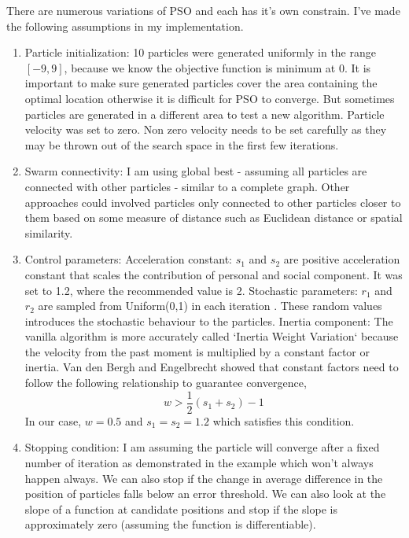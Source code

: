 \documentclass{article}
\begin{document}
There are numerous variations of PSO and each has it's own constrain. I've made the following assumptions in my implementation.
\begin{enumerate}
  \item Particle initialization: 10 particles were generated uniformly in the range $[-9, 9]$, because we know the objective function is minimum at 0. It is important to make sure generated particles cover the area containing the optimal location otherwise it is difficult for PSO to converge. But sometimes particles are generated in a different area to test a new algorithm. Particle velocity was set to zero. Non zero velocity needs to be set carefully as they may be thrown out of the search space in the first few iterations.
  \item Swarm connectivity: I am using global best - assuming all particles are connected with other particles - similar to a complete graph. Other approaches could involved particles only connected to other particles closer to them based on some measure of distance such as Euclidean distance or spatial similarity.
  \item Control parameters: 
  \subitem Acceleration constant: $s_1$ and $s_2$ are positive acceleration constant that scales the contribution of personal and social component. It was  set to 1.2, where the recommended value is 2. \cite{yang2010engineering}
  \subitem Stochastic parameters: $r_1$ and $r_2$ are sampled from Uniform(0,1) in each iteration \cite{engelbrecht2007computational}. These random values introduces the stochastic behaviour to the particles.
  \subitem Inertia component: The vanilla algorithm is more accurately called `Inertia Weight Variation` because the velocity from the past moment is multiplied by a constant factor or inertia. Van den Bergh and Engelbrecht showed that constant factors need to follow the following relationship to guarantee convergence,
  \begin{equation}
    w > \frac{1}{2}(s_1 + s_2) - 1
    \end{equation}
In our case, $w =0.5$ and $s_1 = s_2 = 1.2$ which satisfies this condition.
  \item Stopping condition: I am assuming the particle will converge after a fixed number of iteration as demonstrated in the example which won't always happen always. We can also stop if the change in average difference in the position of particles falls below an error threshold. We can also look at the slope of a function at candidate positions and stop if the slope is approximately zero (assuming the function is differentiable).
\end{enumerate}
\end{document}
